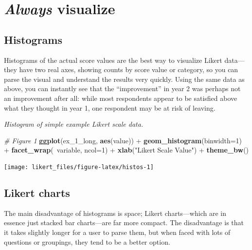 \documentclass[]{book}
\newenvironment{Shaded}{\begin{snugshade}}{\end{snugshade}}
\newcommand{\KeywordTok}[1]{\textcolor[rgb]{0.13,0.29,0.53}{\textbf{{#1}}}}
\newcommand{\DataTypeTok}[1]{\textcolor[rgb]{0.13,0.29,0.53}{{#1}}}
\newcommand{\DecValTok}[1]{\textcolor[rgb]{0.00,0.00,0.81}{{#1}}}
\newcommand{\StringTok}[1]{\textcolor[rgb]{0.31,0.60,0.02}{{#1}}}
\newcommand{\CommentTok}[1]{\textcolor[rgb]{0.56,0.35,0.01}{\textit{{#1}}}}
\newcommand{\NormalTok}[1]{{#1}}
\begin{document}
\chapter{\texorpdfstring{\emph{Always}
visualize}{Always visualize}}\label{always-visualize}

\section{Histograms}\label{histograms}

Histograms of the actual score values are the best way to visualize
Likert data---they have two real axes, showing counts by score value or
category, so you can parse the visual and understand the results very
quickly. Using the same data as above, you can instantly see that the
``improvement'' in year 2 was perhaps not an improvement after all:
while most respondents appear to be satisfied above what they thought in
year 1, one respondent may be at risk of leaving.

\emph{Histogram of simple example Likert scale data.}

\begin{Shaded}
\begin{Highlighting}[]
\CommentTok{# Figure 1}
\KeywordTok{ggplot}\NormalTok{(ex_1_long, }\KeywordTok{aes}\NormalTok{(value)) +}
\StringTok{    }\KeywordTok{geom_histogram}\NormalTok{(}\DataTypeTok{binwidth=}\DecValTok{1}\NormalTok{) +}
\StringTok{    }\KeywordTok{facet_wrap}\NormalTok{(~variable, }\DataTypeTok{ncol=}\DecValTok{1}\NormalTok{) +}
\StringTok{    }\KeywordTok{xlab}\NormalTok{(}\StringTok{"Likert Scale Value"}\NormalTok{) +}
\StringTok{    }\KeywordTok{theme_bw}\NormalTok{()}
\end{Highlighting}
\end{Shaded}

\begin{center}\texttt{[image: likert\_files/figure-latex/histos-1]} \end{center}

\section{Likert charts}\label{likert-charts}

The main disadvantage of histograms is space; Likert charts---which are
in essence just stacked bar charts---are far more compact. The
disadvantage is that it takes slightly longer for a user to parse them,
but when faced with lots of questions or groupings, they tend to be a
better option.
\end{document}
